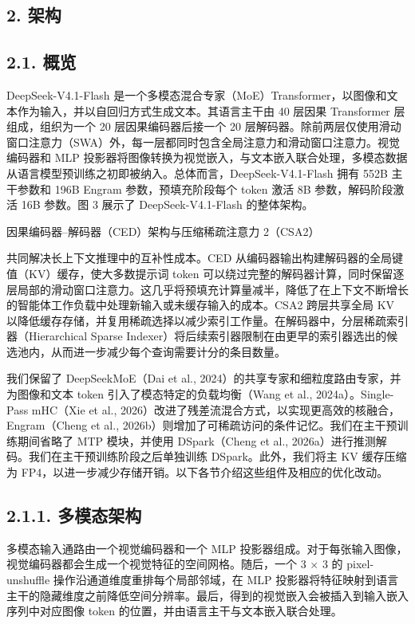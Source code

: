 \subsection{2. 架构}\label{architecture}

\subsection{2.1. 概览}\label{overview}

DeepSeek-V4.1-Flash 是一个多模态混合专家（MoE）Transformer，以图像和文本作为输入，并以自回归方式生成文本。其语言主干由 40 层因果 Transformer 层组成，组织为一个 20 层因果编码器后接一个 20 层解码器。除前两层仅使用滑动窗口注意力（SWA）外，每一层都同时包含全局注意力和滑动窗口注意力。视觉编码器和 MLP 投影器将图像转换为视觉嵌入，与文本嵌入联合处理，多模态数据从语言模型预训练之初即被纳入。总体而言，DeepSeek-V4.1-Flash 拥有 552B 主干参数和 196B Engram 参数，预填充阶段每个 token 激活 8B 参数，解码阶段激活 16B 参数。图 3 展示了 DeepSeek-V4.1-Flash 的整体架构。

因果编码器--解码器（CED）架构与压缩稀疏注意力 2（CSA2）



共同解决长上下文推理中的互补性成本。CED 从编码器输出构建解码器的全局键值（KV）缓存，使大多数提示词 token 可以绕过完整的解码器计算，同时保留逐层局部的滑动窗口注意力。这几乎将预填充计算量减半，降低了在上下文不断增长的智能体工作负载中处理新输入或未缓存输入的成本。CSA2 跨层共享全局 KV 以降低缓存存储，并复用稀疏选择以减少索引工作量。在解码器中，分层稀疏索引器（Hierarchical Sparse Indexer）将后续索引器限制在由更早的索引器选出的候选池内，从而进一步减少每个查询需要计分的条目数量。

我们保留了 DeepSeekMoE（Dai et al., 2024）的共享专家和细粒度路由专家，并为图像和文本 token 引入了模态特定的负载均衡（Wang et al., 2024a）。Single-Pass mHC（Xie et al., 2026）改进了残差流混合方式，以实现更高效的核融合，Engram（Cheng et al., 2026b）则增加了可稀疏访问的条件记忆。我们在主干预训练期间省略了 MTP 模块，并使用 DSpark（Cheng et al., 2026a）进行推测解码。我们在主干预训练阶段之后单独训练 DSpark。此外，我们将主 KV 缓存压缩为 FP4，以进一步减少存储开销。以下各节介绍这些组件及相应的优化改动。

\subsection{2.1.1. 多模态架构}\label{multimodal-architecture}

多模态输入通路由一个视觉编码器和一个 MLP 投影器组成。对于每张输入图像，视觉编码器都会生成一个视觉特征的空间网格。随后，一个 3 $\times$ 3 的 pixel-unshuffle 操作沿通道维度重排每个局部邻域，在 MLP 投影器将特征映射到语言主干的隐藏维度之前降低空间分辨率。最后，得到的视觉嵌入会被插入到输入嵌入序列中对应图像 token 的位置，并由语言主干与文本嵌入联合处理。

